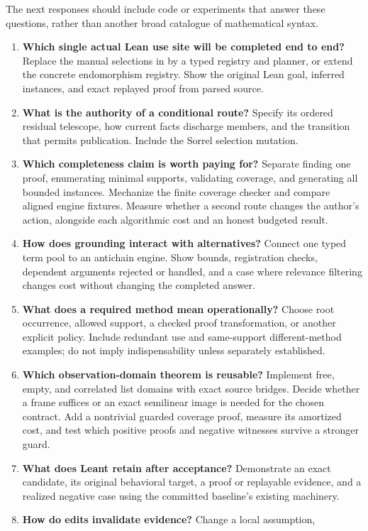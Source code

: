 \documentclass[11pt,letterpaper]{article}
\newcommand{\code}[1]{\texttt{\detokenize{#1}}}
\theoremstyle{definition}\newtheorem{definition}[proposition]{Definition}
\theoremstyle{remark}\newtheorem{remark}[proposition]{Remark}
\begin{document}
The next responses should include code or experiments that answer these
questions, rather than another broad catalogue of mathematical syntax.
\begin{enumerate}
\item \textbf{Which single actual Lean use site will be completed end to end?}
Replace the manual selections in \code{FreyRoutes.lean} by a typed registry
and planner, or extend the concrete endomorphism registry. Show the original
Lean goal, inferred instances, and exact replayed proof from parsed source.
\item \textbf{What is the authority of a conditional route?} Specify its
ordered residual telescope, how current facts discharge members, and the
transition that permits publication. Include the Sorrel selection mutation.
\item \textbf{Which completeness claim is worth paying for?} Separate finding
one proof, enumerating minimal supports, validating coverage, and generating
all bounded instances. Mechanize the finite coverage checker and compare
aligned engine fixtures. Measure whether a second route changes the author's
action, alongside each algorithmic cost and an honest budgeted result.
\item \textbf{How does grounding interact with alternatives?} Connect one
typed term pool to an antichain engine. Show bounds, registration checks,
dependent arguments rejected or handled, and a case where relevance filtering
changes cost without changing the completed answer.
\item \textbf{What does a required method mean operationally?} Choose root
occurrence, allowed support, a checked proof transformation, or another
explicit policy. Include redundant use and same-support different-method
examples; do not imply indispensability unless separately established.
\item \textbf{Which observation-domain theorem is reusable?} Implement free,
empty, and correlated list domains with exact source bridges. Decide whether
a frame suffices or an exact semilinear image is needed for the chosen contract.
Add a nontrivial guarded coverage proof, measure its amortized cost, and test
which positive proofs and negative witnesses survive a stronger guard.
\item \textbf{What does Leant retain after acceptance?} Demonstrate an exact
candidate, its original behavioral target, a proof or replayable evidence,
and a realized negative case using the committed baseline's existing machinery.
\item \textbf{How do edits invalidate evidence?} Change a local assumption,

\end{enumerate}
\end{document}
